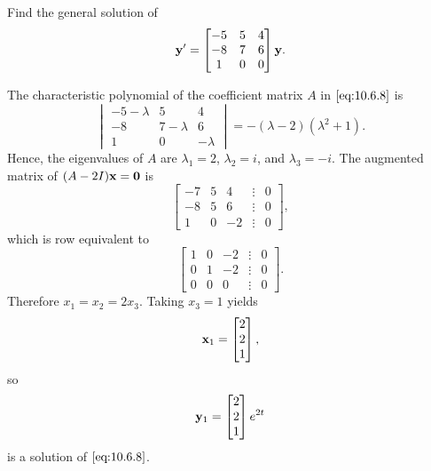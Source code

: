 \documentclass{ximera}
\begin{document}
\begin{example}\label{example:10.6.3}
 Find the general solution of
\begin{equation} \label{eq:10.6.8}
{\bf y}'=\begin{bmatrix}-5&5&4\\-8&7&6\\1&0&0\end{bmatrix}{\bf y}.
\end{equation}

\begin{explanation} 
The characteristic
polynomial of the  coefficient matrix $A$ in  $\eqref{eq:10.6.8}$ is
$$
\begin{vmatrix}-5-\lambda&5&4\\-8&7-\lambda&
6\\ 1
&0&-\lambda\end{vmatrix}=-(\lambda-2)(\lambda^2+1).
$$
Hence, the eigenvalues of $A$ are $\lambda_1=2$, $\lambda_2=i$, and
$\lambda_3=-i$.
The augmented matrix of $(A-2I){\bf x=0}$ is
$$
\begin{bmatrix}-7&5&4&\vdots&0\\-8&
5&6&\vdots&0\\ 1&0&-2&\vdots&0
\end{bmatrix},
$$
which is row equivalent to
$$
\begin{bmatrix} 1&0&-2&\vdots&0\\ 0&1&-2&
\vdots&0\\ 0&0&0&\vdots&0\end{bmatrix}.
$$
Therefore $x_1=x_2=2x_3$.  Taking $x_3=1$ yields
$$
{\bf x}_1=\begin{bmatrix}2\\2\\1\end{bmatrix},
$$
so
$$
{\bf y}_1=\begin{bmatrix}2\\2\\1\end{bmatrix}e^{2t}
$$
is a solution of  $\eqref{eq:10.6.8}$.


\end{explanation}
\end{example}
\end{document}
